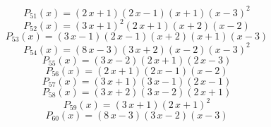 \subitem \begin{dmath*}P_{51}(x) = {\left(2 \, x + 1\right)} {\left(2 \, x - 1\right)} {\left(x + 1\right)} {\left(x - 3\right)}^{2} \end{dmath*}\vspace{- 1.20000000000000 cm}
\subitem \begin{dmath*}P_{52}(x) = {\left(3 \, x + 1\right)}^{2} {\left(2 \, x + 1\right)} {\left(x + 2\right)} {\left(x - 2\right)} \end{dmath*}\vspace{- 1.20000000000000 cm}
\subitem \begin{dmath*}P_{53}(x) = {\left(3 \, x - 1\right)} {\left(2 \, x - 1\right)} {\left(x + 2\right)} {\left(x + 1\right)} {\left(x - 3\right)} \end{dmath*}\vspace{- 1.20000000000000 cm}
\subitem \begin{dmath*}P_{54}(x) = {\left(8 \, x - 3\right)} {\left(3 \, x + 2\right)} {\left(x - 2\right)} {\left(x - 3\right)}^{2} \end{dmath*}\vspace{- 1.20000000000000 cm}
\subitem \begin{dmath*}P_{55}(x) = {\left(3 \, x - 2\right)} {\left(2 \, x + 1\right)} {\left(2 \, x - 3\right)} \end{dmath*}\vspace{- 1.20000000000000 cm}
\subitem \begin{dmath*}P_{56}(x) = {\left(2 \, x + 1\right)} {\left(2 \, x - 1\right)} {\left(x - 2\right)} \end{dmath*}\vspace{- 1.20000000000000 cm}
\subitem \begin{dmath*}P_{57}(x) = {\left(3 \, x + 1\right)} {\left(3 \, x - 1\right)} {\left(2 \, x - 1\right)} \end{dmath*}\vspace{- 1.20000000000000 cm}
\subitem \begin{dmath*}P_{58}(x) = {\left(3 \, x + 2\right)} {\left(3 \, x - 2\right)} {\left(2 \, x + 1\right)} \end{dmath*}\vspace{- 1.20000000000000 cm}
\subitem \begin{dmath*}P_{59}(x) = {\left(3 \, x + 1\right)} {\left(2 \, x + 1\right)}^{2} \end{dmath*}\vspace{- 1.20000000000000 cm}
\subitem \begin{dmath*}P_{60}(x) = {\left(8 \, x - 3\right)} {\left(3 \, x - 2\right)} {\left(x - 3\right)} \end{dmath*}\vspace{- 1.20000000000000 cm}
